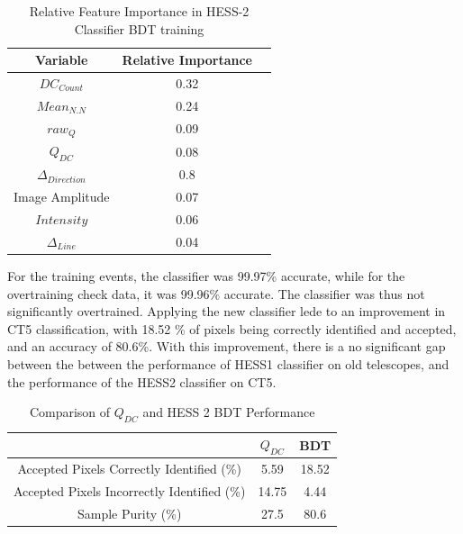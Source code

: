 \documentclass[11pt]{article}
\begin{document}
\begin{table}[h!]
  \centering
  \caption{Relative Feature Importance in HESS-2 Classifier BDT training}
  \label{tab:hess2classifier}
  \begin{tabular}{ccc}
    \toprule
    Variable & Relative Importance\\
    \midrule
    $DC_{Count}$ & 0.32\\
    $Mean_{N.N}$ & 0.24\\
    $raw_{Q}$ & 0.09\\
    $Q_{DC}$ & 0.08\\
    $\Delta_{Direction}$ & 0.8\\
    Image Amplitude & 0.07\\
    $Intensity$ & 0.06\\
    $\Delta_{Line}$ & 0.04\\
    \bottomrule
  \end{tabular}
\end{table}

For the training events, the classifier was 99.97\% accurate, while for the overtraining check data, it was 99.96\% accurate. The classifier was thus not significantly overtrained. Applying the new classifier lede to an improvement in CT5 classification, with 18.52 \% of pixels being correctly identified and accepted, and an accuracy of 80.6\%. With this improvement, there is a no significant gap between the between the performance of HESS1 classifier on old telescopes, and the performance of the HESS2 classifier on CT5.  

\begin{table}[h!]
  \centering
  \caption{Comparison of $Q_{DC}$ and HESS 2 BDT Performance}
  \label{tab:qdcbdtcomparison2}
  \begin{tabular}{ccc}
    \toprule
    & $Q_{DC}$ & BDT\\
    \midrule
    Accepted Pixels Correctly Identified (\%) & 5.59 & 18.52 \\
    Accepted Pixels Incorrectly Identified (\%) & 14.75 & 4.44 \\
    Sample Purity (\%) & 27.5 & 80.6 \\
    \bottomrule
  \end{tabular}
\end{table}
\end{document}
